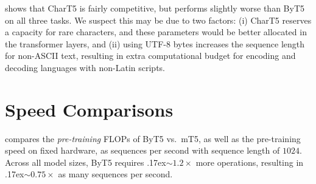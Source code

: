 \documentclass[11pt,a4paper]{article}
\newcommand{\bettertilde}{\raise.17ex\hbox{$\scriptstyle\sim$}}
\begin{document}
 shows that CharT5 is fairly competitive, but performs slightly worse than ByT5 on all three tasks. We suspect this may be due to two factors: (i) CharT5 reserves a capacity for rare characters, and these parameters would be better allocated in the transformer layers, and (ii) using UTF-8 bytes increases the sequence length for non-ASCII text, resulting in extra computational budget for encoding and decoding languages with non-Latin scripts.

\section{Speed Comparisons}
\label{sec:speed}

\begin{table}[t!]
\centering
{}
\caption{Pre-training speed and computation of mT5 vs.~ByT5. \textbf{Left}: Sequences per second pre-training on a TPUv3-64 device. \textbf{Right}: Total einsum operations for a forward pass, as logged by the T5 framework.}
\label{tab:speed_pretraining}

\end{table}

 compares the \textit{pre-training} FLOPs of ByT5 vs.~mT5, as well as the pre-training speed on fixed hardware, as sequences per second with sequence length of $1024$. Across all model sizes, ByT5 requires \bettertilde{}$1.2\times$ more operations, resulting in \bettertilde{}$0.75\times$ as many sequences per second.
\end{document}

